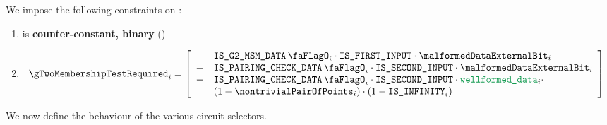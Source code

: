 We impose the following constraints on \gTwoMembershipTestRequired{}:
\begin{enumerate}
    \item \gTwoMembershipTestRequired{} is \textbf{counter-constant, binary} \quad (\trash)
    \item 
        \[
            \gTwoMembershipTestRequired_{i} = 
            \left[ \begin{array}{cl} 
                + & \isBlsGTwoMsmData_{i} \cdot \isFirstInput \cdot \malformedDataExternalBit_{i}  \\
                + & \isBlsPairingCheckData_{i} \cdot \isSecondInput \cdot \malformedDataExternalBit_{i} \\
                + & \isBlsPairingCheckData_{i} \cdot \isSecondInput \cdot \locWellformedData_{i} \cdot \\
                & (1 - \nontrivialPairOfPoints_{i}) \cdot (1 - \isInfinity_{i}) \\
            \end{array} \right] \\
        \]
\end{enumerate}
We now define the behaviour of the various circuit selectors.
